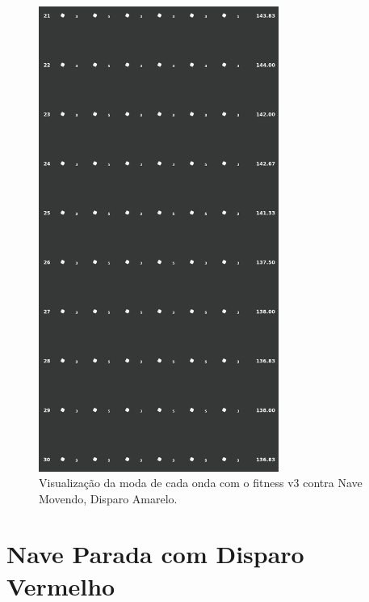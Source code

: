 \begin{figure}[H]
  \centering
  \includegraphics[width=0.7\textwidth]{figuras/ss/ss_yellowstill_ai_mode_2_3.png}
  \caption{Visualização da moda de cada onda com o fitness v3 contra Nave Movendo, Disparo Amarelo.}
  \label{fig:ss-moda-ym-2-3}
\end{figure}

\section{Nave Parada com Disparo Vermelho}
\label{sec:apend-moda-ss-rs-v3}

